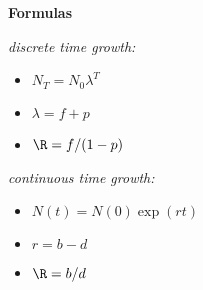 \noindent\textbf{Formulas}
 
\noindent\textsl{discrete time growth:}
\begin{itemize}
\item $N_T = N_0 \lambda^T$
\item $\lambda = f + p$
\item $\R = f/(1-p)$
\end{itemize}
 
\noindent\textsl{continuous time growth:}
\begin{itemize}
\item $N(t) = N(0) \exp(rt)$
\item $r=b-d$
\item $\R = b/d$
\end{itemize} 
